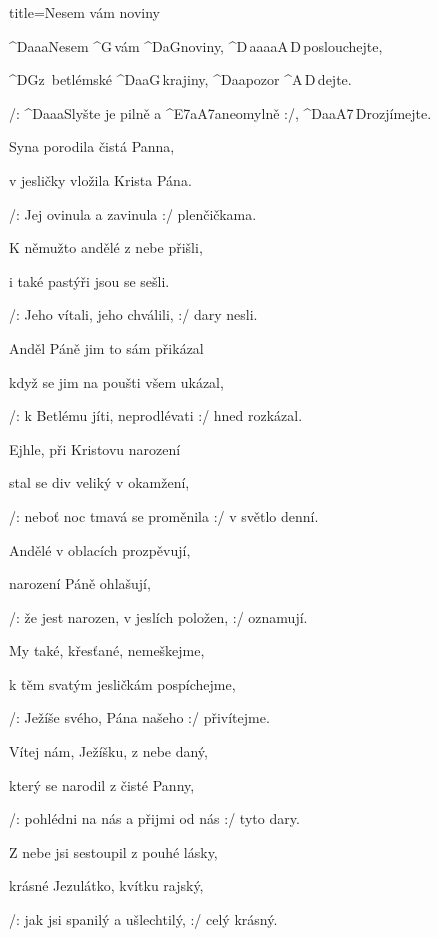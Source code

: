 \begin{song}{title=\predtitle\centering Nesem vám noviny \\\large   \vspace*{-0.3cm}}  %
\begin{centerjustified}
\nejvetsi

\sloka
	^{D{\color{white}aaa}}Nesem ^{G\,}vám ^{D{\color{white}a}G}noviny, ^{D\,{\color{white}aaaa}A\,D\,}poslouchejte,

	^{D\z G}z~betlémské ^{D{\color{white}aa}G\,}krajiny, ^{D{\color{white}aa}}pozor ^{A\,D\,}dejte.

	/: ^{D{\color{white}aaa}}Slyšte je pilně a ^{E7{\color{white}a}A7{\color{white}a}}neomylně :/, ^{D{\color{white}aa}A7\,D}rozjímejte. 

\sloka
	Syna porodila čistá Panna,

	v jesličky vložila Krista Pána.

	/: Jej ovinula a zavinula :/ plenčičkama.

\sloka
	K němužto andělé z nebe přišli,

	i také pastýři jsou se sešli.

	/: Jeho vítali, jeho chválili, :/ dary nesli.

\sloka
	Anděl Páně jim to sám přikázal

	když se jim na poušti všem ukázal,

	/: k Betlému jíti, neprodlévati :/ hned rozkázal.

\sloka
	Ejhle, při Kristovu narození

	stal se div veliký v okamžení,

	/: neboť noc tmavá se proměnila :/ v světlo denní.

\sloka
	Andělé v oblacích prozpěvují,

	narození Páně ohlašují,

	/: že jest narozen, v jeslích položen, :/ oznamují.

\sloka
	My také, křesťané, nemeškejme,

	k těm svatým jesličkám pospíchejme,

	/: Ježíše svého, Pána našeho :/ přivítejme.

\sloka
	Vítej nám, Ježíšku, z nebe daný,

	který se narodil z čisté Panny,

	/: pohlédni na nás a přijmi od nás :/ tyto dary.

\sloka
	Z nebe jsi sestoupil z pouhé lásky,

	krásné Jezulátko, kvítku rajský,

	/: jak jsi spanilý a ušlechtilý, :/ celý krásný.

\end{centerjustified}
\setcounter{Slokočet}{0}
\end{song}
